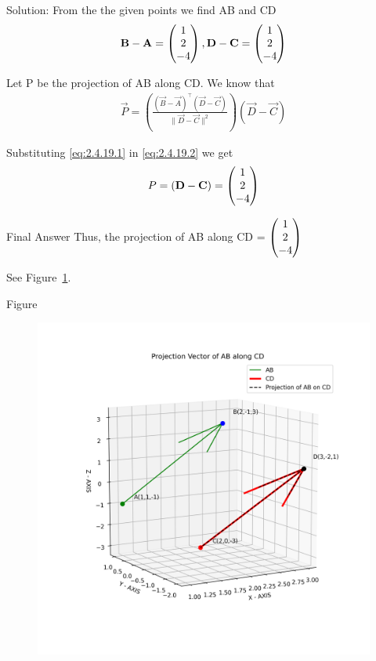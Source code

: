 \documentclass{beamer}
\begin{document}
\begin{frame}{Solution: }
\noindent
From the the given points we find AB and CD
\begin{align}
\mathbf{B} - \mathbf{A} = \begin{pmatrix}1 \\ 2 \\-4\end{pmatrix}, \mathbf{D} - \mathbf{C} = \begin{pmatrix}1 \\ 2 \\-4\end{pmatrix}
\label{eq:2.4.19.1}
\end{align}

Let P be the projection of AB along CD. We know that
\begin{align}
    \vec{P} = (\frac{(\vec{B} - \vec{A})^\top (\vec{D} - \vec{C})}{\|\vec{D} - \vec{C}\|^2}) (\vec{D} - \vec{C})
    \label{eq:2.4.19.2}
\end{align}

Substituting \eqref{eq:2.4.19.1} in \eqref{eq:2.4.19.2} we get
\begin{align}
    P = (\mathbf{D} - \mathbf{C}) =  \begin{pmatrix}1 \\ 2 \\-4\end{pmatrix}
\end{align}

\end{frame}

\begin{frame}{Final Answer}
  Thus, the projection of AB along CD = $\begin{pmatrix}1 \\ 2 \\-4\end{pmatrix}\\$

See Figure~\ref{fig:3DVectors}.   
\end{frame}

\begin{frame}{Figure}
    \begin{figure}[h!]
    \centering
    \includegraphics[width=0.7\linewidth]{figs/fig.png}
    \caption{}
    \label{fig:3DVectors}
\end{figure}
\end{frame}
\end{document}
